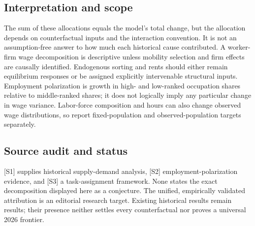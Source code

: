 \documentclass[11pt,a4paper]{article}
\begin{document}
\subsection*{Interpretation and scope}
The sum of these allocations equals the model's total change, but the allocation depends on counterfactual inputs and the interaction convention. It is not an assumption-free answer to how much each historical cause contributed. A worker-firm wage decomposition is descriptive unless mobility selection and firm effects are causally identified. Endogenous sorting and rents should either remain equilibrium responses or be assigned explicitly intervenable structural inputs. Employment polarization is growth in high- and low-ranked occupation shares relative to middle-ranked shares; it does not logically imply any particular change in wage variance. Labor-force composition and hours can also change observed wage distributions, so report fixed-population and observed-population targets separately.
\subsection*{Source audit and status}
[S1] supplies historical supply-demand analysis, [S2] employment-polarization evidence, and [S3] a task-assignment framework. None states the exact decomposition displayed here as a conjecture. The unified, empirically validated attribution is an editorial research target. Existing historical results remain results; their presence neither settles every counterfactual nor proves a universal 2026 frontier.
\end{document}
